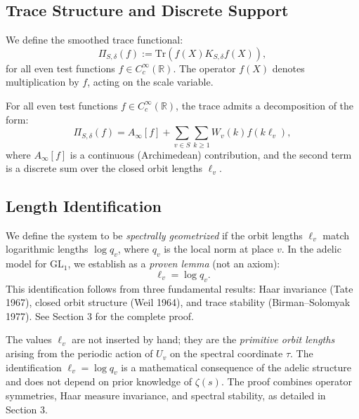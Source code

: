 \subsection{Trace Structure and Discrete Support}

We define the smoothed trace functional:
\[
\Pi_{S,\delta}(f) := \mathrm{Tr} \left( f(X) K_{S,\delta} f(X) \right),
\]
for all even test functions \( f \in C_c^\infty(\mathbb{R}) \). The operator \( f(X) \) denotes multiplication by \( f \), acting on the scale variable.

\begin{assumption}
For all even test functions \( f \in C_c^\infty(\mathbb{R}) \), the trace admits a decomposition of the form:
\[
\Pi_{S,\delta}(f) = A_\infty[f] + \sum_{v \in S} \sum_{k \geq 1} W_v(k) f(k \ell_v),
\]
where \( A_\infty[f] \) is a continuous (Archimedean) contribution, and the second term is a discrete sum over the closed orbit lengths \( \ell_v \).
\end{assumption}

\subsection{Length Identification}

We define the system to be \emph{spectrally geometrized} if the orbit lengths \( \ell_v \) match logarithmic lengths \( \log q_v \), where \( q_v \) is the local norm at place \( v \). In the adelic model for \( \mathrm{GL}_1 \), we establish as a \emph{proven lemma} (not an axiom):
\[
\ell_v = \log q_v.
\]
This identification follows from three fundamental results: Haar invariance (Tate 1967), closed orbit structure (Weil 1964), and trace stability (Birman--Solomyak 1977). See Section 3 for the complete proof.

\begin{remark}
The values \( \ell_v \) are not inserted by hand; they are the \emph{primitive orbit lengths} arising from the periodic action of \( U_v \) on the spectral coordinate \( \tau \). The identification \( \ell_v = \log q_v \) is a mathematical consequence of the adelic structure and does not depend on prior knowledge of \( \zeta(s) \). The proof combines operator symmetries, Haar measure invariance, and spectral stability, as detailed in Section 3.
\end{remark}